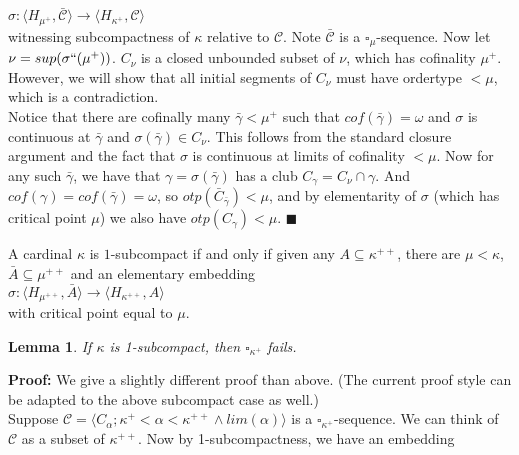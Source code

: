 \documentclass[12pt]{article}
\newtheorem{lem}[thm]{Lemma}
\begin{document}
\indent \indent $\sigma : \langle H_{\mu^+} , \bar{\mathscr{C}} \rangle \longrightarrow \langle H_{\kappa^+ }, \mathscr{C} \rangle$\\

witnessing subcompactness of $\kappa$ relative to $\mathscr{C}$.  Note $\bar{\mathscr{C}}$ is a $\square_\mu$-sequence.  Now let $\nu = sup (\sigma `` (\mu^+))$.  $C_\nu$ is a closed unbounded subset of $\nu$, which has cofinality $\mu^+$.  However, we will show that all initial segments of $C_\nu$ must have ordertype $< \mu$, which is a contradiction.\\

Notice that there are cofinally many $\bar{\gamma} < \mu^+$ such that  $cof (\bar{\gamma}) = \omega$ and $\sigma$ is continuous at $\bar{\gamma}$ and $\sigma ( \bar{\gamma}) \in C_\nu$.  This follows from the standard closure argument and the fact that $\sigma$ is continuous at limits of cofinality $< \mu$.  Now for any such $\bar{\gamma}$, we have that $\gamma = \sigma (\bar{\gamma})$ has a club $C_\gamma = C_\nu \cap \gamma$.  And $cof( \gamma) = cof (\bar{\gamma}) = \omega$, so $otp (\bar{C}_{\bar{\gamma}}) < \mu$, and by elementarity of $\sigma$ (which has critical point $\mu$) we also have $otp (C_\gamma) < \mu$.  $\blacksquare$\\  


\begin{def} \label{1-subcompact}
A cardinal $\kappa$ is $1$-subcompact if and only if given any $A \subseteq \kappa^{++}$, there are $\mu < \kappa$, $\bar{A} \subseteq \mu^{++}$ and an elementary embedding\\

\indent \indent $\sigma : \langle H_{\mu^{++}} , \bar{A} \rangle \longrightarrow \langle H_{\kappa^{++} }, A \rangle$\\

with critical point equal to $\mu$.
\end{def}


\begin{lem}
If $\kappa$ is 1-subcompact, then $\square_{\kappa^+}$ fails.
\end{lem}

\indent \indent \textbf{Proof:} We give a slightly different proof than above.  (The current proof style can be adapted to the above subcompact case as well.)\\

Suppose $\mathscr{C} = \langle C_\alpha ; \kappa^+ < \alpha < \kappa^{++} \wedge  lim( \alpha ) \rangle$ is a $\square_{\kappa^+}$-sequence.  We can think of $\mathscr{C}$ as a subset of $\kappa^{++}$.  Now by 1-subcompactness, we have an embedding\\
\end{document}

